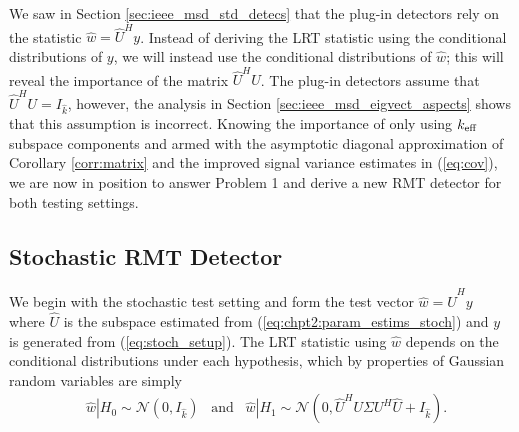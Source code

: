 We saw in Section \ref{sec:ieee_msd_std_detecs} that the plug-in detectors rely on the statistic $\widehat{w}=\widehat{U}^Hy$. Instead of deriving the LRT statistic using the conditional distributions of $y$, we will instead use the conditional distributions of $\widehat{w}$; this will reveal the importance of the matrix $\widehat{U}^HU$. The plug-in detectors assume that $\widehat{U}^HU=I_{\widehat{k}}$, however, the analysis in Section \ref{sec:ieee_msd_eigvect_aspects} shows that this assumption is incorrect. Knowing the importance of only using $k_\text{eff}$ subspace components and armed with the asymptotic diagonal approximation of Corollary \ref{corr:matrix} and the improved signal variance estimates in (\ref{eq:cov}), we are now in position to answer Problem 1 and derive a new RMT detector for both testing settings.

\subsection{Stochastic RMT Detector}\label{sec:ieee_msd_rmt_stoch}

We begin with the stochastic test setting and form the test vector $\widehat{w}=\widehat{U}^Hy$ where $\widehat{U}$ is the subspace estimated from (\ref{eq:chpt2:param_estims_stoch}) and $y$ is generated from (\ref{eq:stoch_setup}). The LRT statistic using $\widehat{w}$ depends on the conditional distributions under each hypothesis, which by properties of Gaussian random variables are simply
\begin{equation}\label{eq:stoch_distr}
\begin{aligned}
&\widehat{w}|H_0\sim\mathcal{N}\left(0,I_{\widehat{k}}\right)\,\,\,\text{ and }\,\,\,\widehat{w}|H_1\sim\mathcal{N}\left(0, \widehat{U}^HU\Sigma U^H\widehat{U} +I_{\widehat{k}}\right).\\
\end{aligned}
\end{equation}

